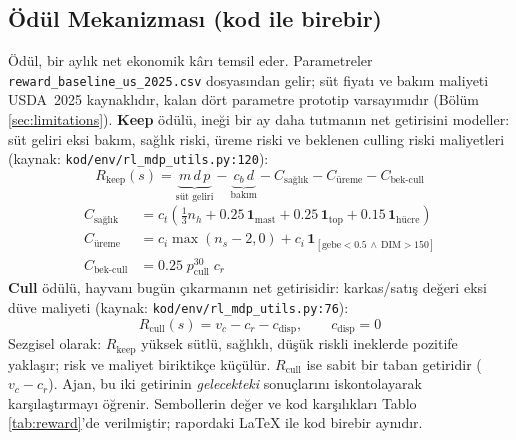 \documentclass[conference]{IEEEtran}
\begin{document}
\subsection{Ödül Mekanizması (kod ile birebir)}
\label{sec:reward}
Ödül, bir aylık net ekonomik kârı temsil eder. Parametreler
\texttt{reward\_baseline\_us\_2025.csv} dosyasından gelir; süt fiyatı ve bakım maliyeti
USDA~2025 kaynaklıdır, kalan dört parametre prototip varsayımıdır (Bölüm
\ref{sec:limitations}). \textbf{Keep} ödülü, ineği bir ay daha tutmanın net getirisini
modeller: süt geliri eksi bakım, sağlık riski, üreme riski ve beklenen culling riski
maliyetleri (kaynak: \texttt{kod/env/rl\_mdp\_utils.py:120}):
\begin{equation}
R_{\text{keep}}(s) = \underbrace{m\,d\,p}_{\text{süt geliri}}
- \underbrace{c_b\,d}_{\text{bakım}}
- C_{\text{sağlık}} - C_{\text{üreme}} - C_{\text{bek-cull}}
\end{equation}
\begin{align}
C_{\text{sağlık}} &= c_t\!\left(\tfrac{1}{3}n_{h} + 0.25\,\mathbf{1}_{\text{mast}} + 0.25\,\mathbf{1}_{\text{top}} + 0.15\,\mathbf{1}_{\text{hücre}}\right)\\
C_{\text{üreme}} &= c_i\max(n_{s}-2,0) + c_i\,\mathbf{1}_{[\text{gebe}<0.5\,\wedge\,\text{DIM}>150]}\\
C_{\text{bek-cull}} &= 0.25\;p^{30}_{\text{cull}}\;c_r
\end{align}
\textbf{Cull} ödülü, hayvanı bugün çıkarmanın net getirisidir: karkas/satış değeri eksi
düve maliyeti (kaynak: \texttt{kod/env/rl\_mdp\_utils.py:76}):
\begin{equation}
R_{\text{cull}}(s) = v_c - c_r - c_{\text{disp}},\qquad c_{\text{disp}}=0
\end{equation}
Sezgisel olarak: $R_{\text{keep}}$ yüksek sütlü, sağlıklı, düşük riskli ineklerde
pozitife yaklaşır; risk ve maliyet biriktikçe küçülür. $R_{\text{cull}}$ ise sabit bir
taban getiridir ($v_c-c_r$). Ajan, bu iki getirinin \emph{gelecekteki} sonuçlarını
iskontolayarak karşılaştırmayı öğrenir. Sembollerin değer ve kod karşılıkları Tablo
\ref{tab:reward}'de verilmiştir; rapordaki LaTeX ile kod birebir aynıdır.
\end{document}
